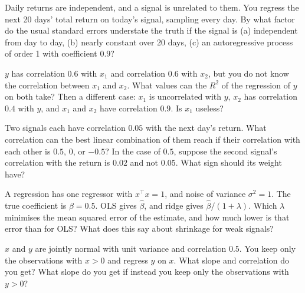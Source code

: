 \begin{question}\label{iq:iv1:regression:21}
Daily returns are independent, and a signal is unrelated to them. You regress the next 20 days' total return on today's signal, sampling every day. By what factor do the usual standard errors understate the truth if the signal is (a) independent from day to day, (b) nearly constant over 20 days, (c) an autoregressive process of order 1 with coefficient $0.9$?
\end{question}

\begin{question}\label{iq:iv1:regression:22}
$y$ has correlation $0.6$ with $x_1$ and correlation $0.6$ with $x_2$, but you do not know the correlation between $x_1$ and $x_2$. What values can the $R^2$ of the regression of $y$ on both take? Then a different case: $x_1$ is uncorrelated with $y$, $x_2$ has correlation $0.4$ with $y$, and $x_1$ and $x_2$ have correlation $0.9$. Is $x_1$ useless?
\end{question}

\begin{question}\label{iq:iv1:regression:23}
Two signals each have correlation $0.05$ with the next day's return. What correlation can the best linear combination of them reach if their correlation with each other is $0.5$, $0$, or $-0.5$? In the case of $0.5$, suppose the second signal's correlation with the return is $0.02$ and not $0.05$. What sign should its weight have?
\end{question}

\begin{question}\label{iq:iv1:regression:24}
A regression has one regressor with $x^\top x = 1$, and noise of variance $\sigma^2 = 1$. The true coefficient is $\beta = 0.5$. OLS gives $\hat\beta$, and ridge gives $\hat\beta/(1 + \lambda)$. Which $\lambda$ minimises the mean squared error of the estimate, and how much lower is that error than for OLS? What does this say about shrinkage for weak signals?
\end{question}

\begin{question}\label{iq:iv1:regression:25}
$x$ and $y$ are jointly normal with unit variance and correlation $0.5$. You keep only the observations with $x > 0$ and regress $y$ on $x$. What slope and correlation do you get? What slope do you get if instead you keep only the observations with $y > 0$?
\end{question}

